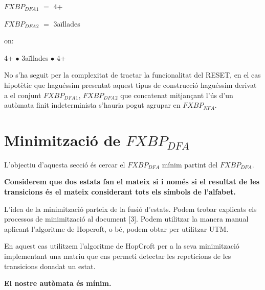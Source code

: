 \documentclass[12pt,a4paper]{report}
\def \dfa{$FXBP_{DFA} $}
\def \nfa{$FXBP_{NFA} $}
\begin{document}
\begin{center}
\dfa$_1$ $=$ 4+
\end{center}

\begin{center}
\dfa$_2$ $=$ 3aïllades
\end{center}

on: 

\begin{center}
4+ $\bullet$ 3aïllades $\bullet$ 4+
\end{center}

No s’ha seguit per la complexitat de tractar la funcionalitat del RESET, en el cas hipotètic que haguéssim presentat aquest tipus de construcció haguéssim derivat a el conjunt {\dfa$_1$, \dfa$_2$} que concatenat mitjançant l'ús d'un autòmata finit indeterminista s'hauria pogut agrupar en \nfa{}.

\section{Minimització de \dfa{}}

L’objectiu d’aquesta secció és cercar el \dfa{} mínim partint del \dfa{}.

\textbf{Considerem que dos estats fan el mateix si i només si el resultat de les transicions és el mateix considerant tots els símbols de l’alfabet. }

L'idea de la minimització parteix de la fusió d'estats. Podem trobar explicats els processos de minimització al document [3]. Podem utilitzar la manera manual aplicant l'algoritme de Hopcroft, o bé, podem obtar per utilitzar UTM.

En aquest cas utilitzem l’algoritme de HopCroft per a la seva minimització implementant una matriu que ens permeti detectar les repeticions de les transicions donadat un estat. 


\begin{center}
\textbf{El nostre autòmata és mínim.}
\end{center}
\end{document}
